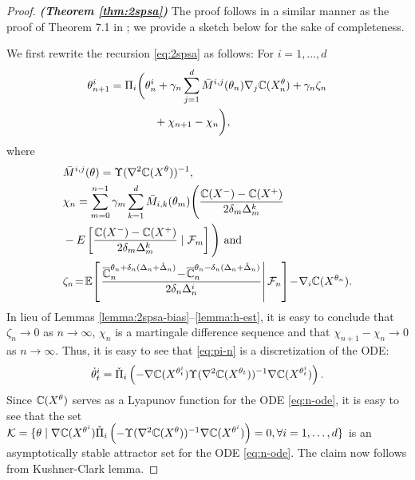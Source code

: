 \begin{proof}\textbf{\textit{(Theorem \ref{thm:2spsa})}}
The proof follows in a similar manner as the proof of Theorem 7.1 in \cite{Bhatnagar13SR}; we provide a sketch below for the sake of completeness.

We first rewrite the recursion \eqref{eq:2spsa} as follows:
For $i=1,\ldots, d$
\begin{align}
 &\theta^{i}_{n+1} = \Pi_{i}\bigg(\theta^{i}_n + \gamma_n \sum_{j=1}^{d} \bar M^{i,j}(\theta_n) \nabla_{j} \mathbb{C}(X^\theta_n) + \gamma_n \zeta_n \nonumber\\
&\qquad\qquad\qquad + \chi_{n+1} - \chi_n \bigg), \label{eq:pi-n}
\end{align}
where 
\begin{align*}
&\bar M^{i,j}(\theta) = \Upsilon(\nabla^2 \mathbb{C}(X^{\theta}))^{-1},\\
& \chi_n = \sum_{m=0}^{n-1} \gamma_m \sum_{k=1}^{d} {\bar{M}}_{i,k}(\theta_m)\Bigg(
\frac{\mathbb{C}(X^{-}) -
\mathbb{C}(X^{+})}{2\delta_m \Delta^k_m} 
 \\
 &- E\left[\frac{\mathbb{C}(X^{-}) -
\mathbb{C}(X^{+})}{2\delta_m \Delta^k_m} 
\mid {\cal F}_m\right]\Bigg) \text{ and}\\
&\zeta_n \!=\! \mathbb{E}\!\left[\left.\dfrac{\overline {\mathbb{C}}_n^{\theta_n + \delta_n (\Delta_n + \hat \Delta_n)} \!-\!\overline {\mathbb{C}}_n^{\theta_n - \delta_n (\Delta_n + \hat \Delta_n)}}{2 \delta_n \Delta_n^i}\right| \mathcal{F}_n \right] \!-\! \nabla_i \mathbb{C}(X^{\theta_n}).
\end{align*}
In lieu of Lemmas \ref{lemma:2spsa-bias}--\ref{lemma:h-est}, it is easy to conclude that $\zeta_n \rightarrow 0$ as $n\rightarrow \infty$, $\chi_n$ is a martingale difference sequence and that $\chi_{n+1} - \chi_n \rightarrow 0$ as $n\rightarrow \infty$. 
Thus, it is easy to see that \eqref{eq:pi-n} is a discretization of the ODE:
\begin{align}
\dot\theta^{i}_t = \check\Pi_{i}\left(- \nabla \mathbb{C}(X^{\theta^{i}_t}) \Upsilon(\nabla^2 \mathbb{C}(X^{\theta_t}))^{-1} \nabla \mathbb{C}(X^{\theta^{i}_t}) \right).
\label{eq:n-ode}
\end{align}
Since $\mathbb{C}(X^{\theta})$ serves as a Lyapunov function for the ODE \eqref{eq:n-ode}, it is easy to see that the set \\$\mathcal{K} = \{\theta \mid
\nabla \mathbb{C}(X^{\theta^{i}})  \check\Pi_{i}\left(-\Upsilon(\nabla^2 \mathbb{C}(X^{\theta}))^{-1} \nabla \mathbb{C}(X^{\theta^{i}})\right)
=0, \forall i=1,\ldots,d\}$ is an asymptotically stable attractor set for the ODE \eqref{eq:n-ode}. The claim now follows from Kushner-Clark lemma.
\end{proof}

